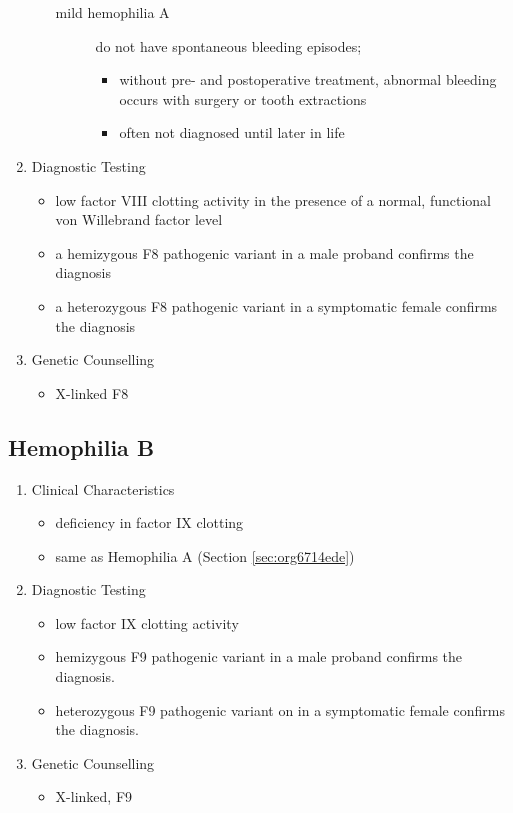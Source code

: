 \documentclass[12pt]{scrartcl}
\begin{document}
\begin{enumerate}
\begin{itemize}
\begin{description}
\item[{mild hemophilia A }] do not have spontaneous bleeding episodes;
\begin{itemize}
\item without pre- and postoperative treatment, abnormal bleeding occurs with surgery
or tooth extractions
\item often not diagnosed until later in life
\end{itemize}
\end{description}
\end{itemize}
\item Diagnostic Testing
\label{sec:org68d04ef}
\begin{itemize}
\item low factor VIII clotting activity in the presence of a normal,
functional von Willebrand factor level
\item a hemizygous F8 pathogenic variant in a male proband confirms the
diagnosis
\item a heterozygous F8 pathogenic variant in a symptomatic female
confirms the diagnosis
\end{itemize}
\item Genetic Counselling
\label{sec:orge43c34e}
\begin{itemize}
\item X-linked F8
\end{itemize}
\end{enumerate}

\subsection{Hemophilia B}
\label{sec:orgdc36ff6}
\begin{enumerate}
\item Clinical Characteristics
\label{sec:orgee295e9}
\begin{itemize}
\item deficiency in factor IX clotting
\item same as Hemophilia A (Section \ref{sec:org6714ede})
\end{itemize}
\item Diagnostic Testing
\label{sec:orgf3a7a76}
\begin{itemize}
\item low factor IX clotting activity
\item hemizygous F9 pathogenic variant in a male proband confirms the
diagnosis.
\item heterozygous F9 pathogenic variant on in a symptomatic female
confirms the diagnosis.
\end{itemize}
\item Genetic Counselling
\label{sec:org4afa826}
\begin{itemize}
\item X-linked, F9
\end{itemize}
\end{enumerate}
\end{document}
